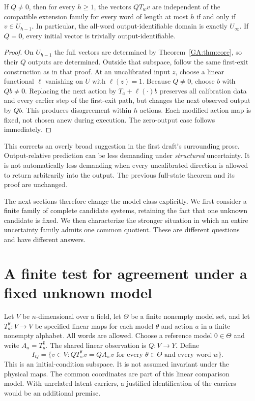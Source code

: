 \begin{GAproposition}\label{GA:prop:noenlargement}
If $Q\ne0$, then for every $h\ge1$, the vectors $QT_wv$ are independent of the compatible extension family for every word of length at most $h$ if and only if $v\in U_{h-1}$. In particular, the all-word output-identifiable domain is exactly $U_\infty$. If $Q=0$, every initial vector is trivially output-identifiable.
\end{GAproposition}
\begin{proof}
On $U_{h-1}$ the full vectors are determined by Theorem~\ref{GA:thm:core}, so their $Q$ outputs are determined. Outside that subspace, follow the same first-exit construction as in that proof. At an uncalibrated input $z$, choose a linear functional $\ell$ vanishing on $U$ with $\ell(z)=1$. Because $Q\ne0$, choose $b$ with $Qb\ne0$. Replacing the next action by $T_a+\ell(\cdot)b$ preserves all calibration data and every earlier step of the first-exit path, but changes the next observed output by $Qb$. This produces disagreement within $h$ actions. Each modified action map is fixed, not chosen anew during execution. The zero-output case follows immediately.
\end{proof}

This corrects an overly broad suggestion in the first draft's surrounding prose. Output-relative prediction can be less demanding under \emph{structured} uncertainty. It is not automatically less demanding when every uncalibrated direction is allowed to return arbitrarily into the output. The previous full-state theorem and its proof are unchanged.

The next sections therefore change the model class explicitly. We first consider a finite family of complete candidate systems, retaining the fact that one unknown candidate is fixed. We then characterize the stronger situation in which an entire uncertainty family admits one common quotient. These are different questions and have different answers.

\section{A finite test for agreement under a fixed unknown model}\label{GA:sec:pairtest}
Let $V$ be $n$-dimensional over a field, let $\Theta$ be a finite nonempty model set, and let $T_a^\theta:V\to V$ be specified linear maps for each model $\theta$ and action $a$ in a finite nonempty alphabet. All words are allowed. Choose a reference model $0\in\Theta$ and write $A_a=T_a^0$. The shared linear observation is $Q:V\to Y$. Define
\[
I_Q=\{v\in V:QT_w^\theta v=QA_wv\text{ for every }\theta\in\Theta\text{ and every word }w\}.
\]
This is an initial-condition subspace. It is not assumed invariant under the physical maps. The common coordinates are part of this linear comparison model. With unrelated latent carriers, a justified identification of the carriers would be an additional premise.

